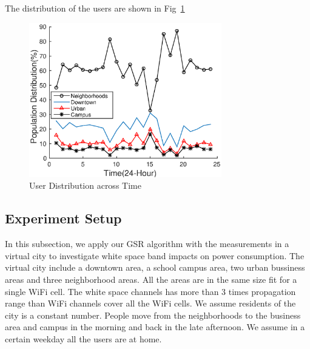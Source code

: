 The distribution of the users are shown in Fig~\ref{fig:wieyeprocess}

\begin{figure}
\vspace{-0.0in}
\centering
\includegraphics[width=84mm]{figures/wieyeprocess}
\vspace{-0.1in}
\caption{User Distribution across Time}
\label{fig:wieyeprocess}
\vspace{-0.1in}
\end{figure}




\subsection{Experiment Setup}
\label{subsec:experimentsetup}

In this subsection, we apply our GSR algorithm with the measurements in a virtual city to investigate 
white space band impacts on power consumption. 
The virtual city include a downtown area, a school campus area, two urban bussiness areas and three 
neighborhood areas. All the areas are in the same size fit for a single WiFi cell. 
The white space channels has more than 3 times propagation range than WiFi channels cover 
all the WiFi cells.
We assume residents of the city is a constant number. 
People move from the neighborhoods to the business area and campus in the morning and back in the late 
afternoon. We assume in a certain weekday all the users are at home. 





